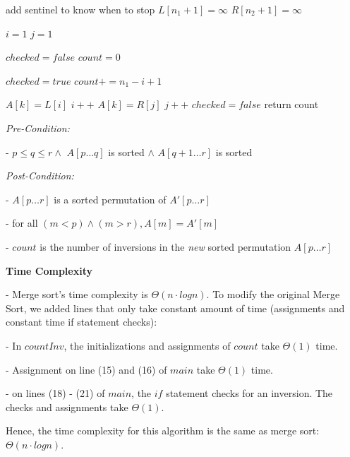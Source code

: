 \documentclass[a4paper]{report}
\begin{document}
\begin{enumerate}
\begin{algorithmic}[1]
          \Comment add sentinel to know when to stop
          \State $L[n_1 + 1] = \infty$
          \State $R[n_2 + 1] = \infty$

          \State $i = 1$
          \State $j = 1$

          \State $checked = false$
          \State $count = 0$

              \State $checked = true$
              \State $count += n_1 - i + 1$
            \EndIf

              \State $A[k] = L[i]$
              \State $i++$
            \Else 
              \State $A[k] = R[j]$
              \State $j++$
              \State $checked = false$
            \EndIf
          \EndFor
          \State return count
        \EndFunction
      \end{algorithmic}

      {\it Pre-Condition:}

        - $p \leq q \leq r \wedge$ $A[p\dots q]$ is sorted $\wedge$ $A[q+1\dots r]$ is sorted 

      {\it Post-Condition:}

        - $A[p\dots r]$ is a sorted permutation of $A'[p \dots r]$

        - for all $(m < p) \wedge (m > r), A[m] = A'[m]$

        - $count$ is the number of inversions in the {\it new} sorted permutation $A[p \dots r]$



      
     {\bf Time Complexity}
      
        - Merge sort's time complexity is $\Theta(n \cdot log n)$. To modify the original Merge Sort, we added lines that only
        take constant amount of time (assignments and constant time if statement checks):

        - In $countInv$, the initializations and assignments of $count$ take $\Theta(1)$ time.

        - Assignment on line (15) and (16) of $main$ take $\Theta(1)$ time.

        - on lines (18) - (21) of $main$, the $if$ statement checks for an inversion. The checks and assignments take $\Theta(1)$.

        Hence, the time complexity for this algorithm is the same as merge sort: $\Theta(n \cdot log n)$.
        






\end{enumerate}
\end{document}
